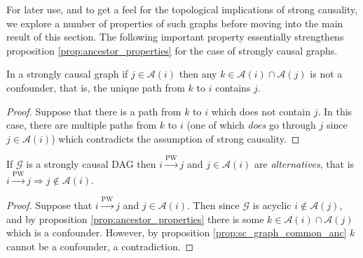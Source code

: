 \documentclass[12pt]{article}
\def\pwgc{\overset{\text{PW}}{\rightarrow}}  %
\def\gcg{\mathcal{G}}  %
\newcommand{\anc}[1]{\mathcal{A}(#1)}  %
\begin{document}

For later use, and to get a feel for the topological implications of
strong causality, we explore a number of properties of such graphs
before moving into the main result of this section.  The following
important property essentially strengthens proposition
\ref{prop:ancestor_properties} for the case of strongly causal graphs.

\begin{proposition}
  \label{prop:sc_graph_common_anc}
  In a strongly causal graph if $j \in \anc{i}$ then any
  $k \in \anc{i} \cap \anc{j}$ is not a confounder, that is,
  the unique path from $k$ to $i$ contains $j$.
\end{proposition}
\begin{proof}
  Suppose that there is a path from $k$ to $i$ which does not contain
  $j$.  In this case, there are multiple paths from $k$ to $i$ (one of
  which \textit{does} go through $j$ since $j \in \anc{i}$) which
  contradicts the assumption of strong causality.
\end{proof}

  
\begin{corollary}
  \label{cor:parent_corollary}
  If $\gcg$ is a strongly causal DAG then $i \pwgc j$ and $j \in \anc{i}$ are
  \textit{alternatives}, that is $i \pwgc j \Rightarrow j \notin \anc{i}$.
\end{corollary}
\begin{proof}
  Suppose that $i \pwgc j$ and $j \in \anc{i}$.  Then since $\gcg$ is
  acyclic $i \not\in \anc{j}$, and by proposition
  \ref{prop:ancestor_properties} there is some
  $k \in \anc{i}\cap\anc{j}$ which is a confounder.  However, by
  proposition \ref{prop:sc_graph_common_anc} $k$ cannot be a
  confounder, a contradiction.
\end{proof}
\end{document}
